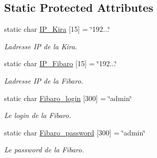\subsection*{Static Protected Attributes}
\begin{DoxyCompactItemize}
\item 
static char \hyperlink{class_e_p_1_1_equipment_a05245b7dd3a4b4e3fb7ab258e6bbe6a2}{I\+P\+\_\+\+Kira} \mbox{[}15\mbox{]} = \char`\"{}192...\char`\"{}\hypertarget{class_e_p_1_1_equipment_a05245b7dd3a4b4e3fb7ab258e6bbe6a2}{}\label{class_e_p_1_1_equipment_a05245b7dd3a4b4e3fb7ab258e6bbe6a2}

\begin{DoxyCompactList}\small\item\em L\textquotesingle{}adresse IP de la Kira. \end{DoxyCompactList}\item 
static char \hyperlink{class_e_p_1_1_equipment_a76405ab4adccec1b32a1c874171749e6}{I\+P\+\_\+\+Fibaro} \mbox{[}15\mbox{]} = \char`\"{}192...\char`\"{}\hypertarget{class_e_p_1_1_equipment_a76405ab4adccec1b32a1c874171749e6}{}\label{class_e_p_1_1_equipment_a76405ab4adccec1b32a1c874171749e6}

\begin{DoxyCompactList}\small\item\em L\textquotesingle{}adresse IP de la Fibaro. \end{DoxyCompactList}\item 
static char \hyperlink{class_e_p_1_1_equipment_a91662c50e9eac8a97c2eb5fcc0f1876c}{Fibaro\+\_\+login} \mbox{[}300\mbox{]} = \char`\"{}admin\char`\"{}\hypertarget{class_e_p_1_1_equipment_a91662c50e9eac8a97c2eb5fcc0f1876c}{}\label{class_e_p_1_1_equipment_a91662c50e9eac8a97c2eb5fcc0f1876c}

\begin{DoxyCompactList}\small\item\em Le login de la Fibaro. \end{DoxyCompactList}\item 
static char \hyperlink{class_e_p_1_1_equipment_ad59ffc7e13909e5586601a1e9ce4f9ee}{Fibaro\+\_\+password} \mbox{[}300\mbox{]} = \char`\"{}admin\char`\"{}\hypertarget{class_e_p_1_1_equipment_ad59ffc7e13909e5586601a1e9ce4f9ee}{}\label{class_e_p_1_1_equipment_ad59ffc7e13909e5586601a1e9ce4f9ee}

\begin{DoxyCompactList}\small\item\em Le password de la Fibaro. \end{DoxyCompactList}\end{DoxyCompactItemize}


